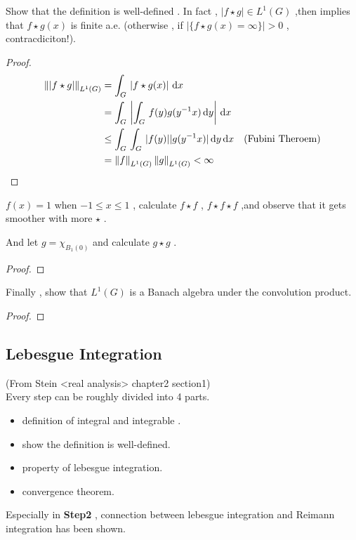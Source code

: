 Show that the definition is well-defined . In fact , $|f\star g| \in L^1(G)$ ,then implies that $f\star g(x)$ is finite a.e. (otherwise , if $\left|\{f\star g(x)=\infty\}\right|>0$ , contracdiciton!).
\begin{proof}
\begin{align*}
\norm{|f\star g|}_{L^1(G)}
&=
\int_G\,
\left|
f\star g(x)
\right|
\,\dd x  \\
&=
\int_G\,
\left|
\int_G\,
f(y) g(y^{-1}x)
\,\dd y
\right|
\,\dd x  \\
&\leq
\int_G\,
\int_G\,
|f(y)|
|g(y^{-1}x)|
\,\dd y
\,\dd x \quad (\text{Fubini Theroem})\\
&=\norm{f}_{L^1(G)}\, \norm{g}_{L^1(G)}
<\infty
\end{align*}
\end{proof}


\begin{example*}[1.2.8]
    $f(x)=1$ when $-1\leq x\leq 1$ , calculate $f\star f$ , $f\star f\star f$ ,and observe that it gets smoother with more $\star$ .
\end{example*}
\begin{remark*}
    And let $g=\chi_{B_1(0)}$ and calculate $g\star g$ .
\end{remark*}

\begin{proof}
    

\end{proof}

Finally , show that $L^1(G)$ is a Banach algebra under the convolution product.

\begin{proof}
    
\end{proof}

\subsection*{Lebesgue Integration}
\noindent (From Stein <real analysis> chapter2 section1)
\\
Every step can be roughly divided into 4 parts.
\begin{itemize}
    \item definition of integral and integrable .
    \item show the definition is well-defined.
    \item property of lebesgue integration.
    \item convergence theorem.
\end{itemize}
Especially in {\bfseries Step2} , connection between lebesgue integration and Reimann integration has been shown.
